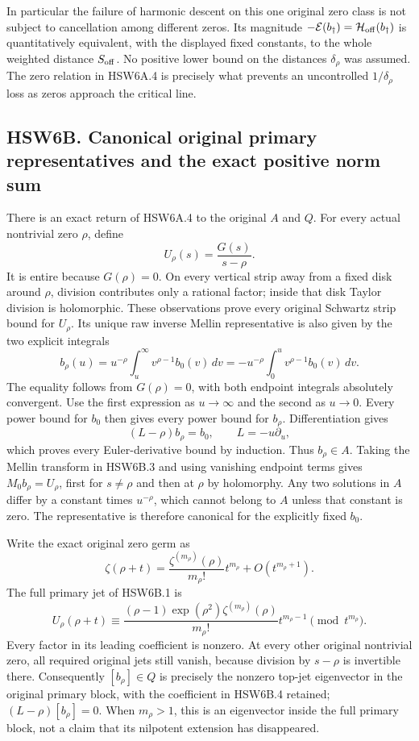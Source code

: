 In particular the failure of harmonic descent on this one original zero
class is not subject to cancellation among different zeros. Its
magnitude \(-\mathcal E(b_\dagger)=\mathcal H_{\rm off}(b_\dagger)\) is
quantitatively equivalent, with the displayed fixed constants, to the
whole weighted distance \(S_{\rm off}\). No positive lower bound on the
distances \(\delta_\rho\) was assumed. The zero relation in HSW6A.4 is
precisely what prevents an uncontrolled \(1/\delta_\rho\) loss as zeros
approach the critical line.

\subsection{HSW6B. Canonical original primary representatives and the
exact positive norm
sum}\label{hsw6b.-canonical-original-primary-representatives-and-the-exact-positive-norm-sum}

There is an exact return of HSW6A.4 to the original \(A\) and \(Q\). For
every actual nontrivial zero \(\rho\), define \[
U_\rho(s)=\frac{G(s)}{s-\rho}.
\tag{HSW6B.1}
\] It is entire because \(G(\rho)=0\). On every vertical strip away from
a fixed disk around \(\rho\), division contributes only a rational
factor; inside that disk Taylor division is holomorphic. These
observations prove every original Schwartz strip bound for \(U_\rho\).
Its unique raw inverse Mellin representative is also given by the two
explicit integrals \[
\boxed{
b_\rho(u)=u^{-\rho}\int_u^\infty v^{\rho-1}b_0(v)\,dv
=-u^{-\rho}\int_0^u v^{\rho-1}b_0(v)\,dv.}
\tag{HSW6B.2}
\] The equality follows from \(G(\rho)=0\), with both endpoint integrals
absolutely convergent. Use the first expression as \(u\to\infty\) and
the second as \(u\to0\). Every power bound for \(b_0\) then gives every
power bound for \(b_\rho\). Differentiation gives \[
(L-\rho)b_\rho=b_0,\qquad L=-u\partial_u,
\tag{HSW6B.3}
\] which proves every Euler-derivative bound by induction. Thus
\(b_\rho\in A\). Taking the Mellin transform in HSW6B.3 and using
vanishing endpoint terms gives \(M_0b_\rho=U_\rho\), first for
\(s\ne\rho\) and then at \(\rho\) by holomorphy. Any two solutions in
\(A\) differ by a constant times \(u^{-\rho}\), which cannot belong to
\(A\) unless that constant is zero. The representative is therefore
canonical for the explicitly fixed \(b_0\).

Write the exact original zero germ as \[
\zeta(\rho+t)=\frac{\zeta^{(m_\rho)}(\rho)}{m_\rho!}t^{m_\rho}
+O(t^{m_\rho+1}).
\] The full primary jet of HSW6B.1 is \[
U_\rho(\rho+t)\equiv
\frac{(\rho-1)\exp(\rho^2)\zeta^{(m_\rho)}(\rho)}{m_\rho!}
t^{m_\rho-1}
\pmod{t^{m_\rho}}.
\tag{HSW6B.4}
\] Every factor in its leading coefficient is nonzero. At every other
original nontrivial zero, all required original jets still vanish,
because division by \(s-\rho\) is invertible there. Consequently
\([b_\rho]\in Q\) is precisely the nonzero top-jet eigenvector in the
original primary block, with the coefficient in HSW6B.4 retained;
\((L-\rho)[b_\rho]=0\). When \(m_\rho>1\), this is an eigenvector inside
the full primary block, not a claim that its nilpotent extension has
disappeared.


